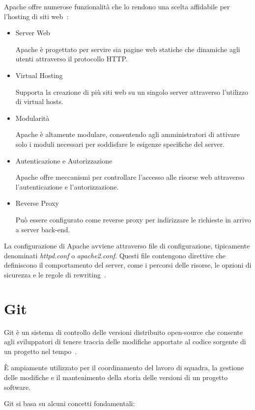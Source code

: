 Apache offre numerose funzionalità che lo rendono una scelta affidabile per l'hosting di siti web~\cite{APACHE}:
\begin{itemize}
    \item Server Web

    Apache è progettato per servire sia pagine web statiche che dinamiche agli utenti attraverso il protocollo HTTP.

    \item Virtual Hosting
    
    Supporta la creazione di più siti web su un singolo server attraverso l'utilizzo di virtual hosts.

    \item Modularità
    
    Apache è altamente modulare, consentendo agli amministratori di attivare solo i moduli necessari per soddisfare le esigenze specifiche del server.

    \item Autenticazione e Autorizzazione
    
    Apache offre meccanismi per controllare l'accesso alle risorse web attraverso l'autenticazione e l'autorizzazione.

    \item Reverse Proxy
    
    Può essere configurato come reverse proxy per indirizzare le richieste in arrivo a server back-end.
\end{itemize}

La configurazione di Apache avviene attraverso file di configurazione, tipicamente denominati \emph{httpd.conf} o \emph{apache2.conf}. Questi file contengono direttive che definiscono il comportamento del server, come i percorsi delle risorse, le opzioni di sicurezza e le regole di rewriting~\cite{APACHE, XAMPP}.


\section{Git}
Git è un sistema di controllo delle versioni distribuito open-source che consente agli sviluppatori di tenere traccia delle modifiche apportate al codice sorgente di un progetto nel tempo~\cite{GIT, GIT2}.

È ampiamente utilizzato per il coordinamento del lavoro di squadra, la gestione delle modifiche e il mantenimento della storia delle versioni di un progetto software.

Git si basa su alcuni concetti fondamentali:


